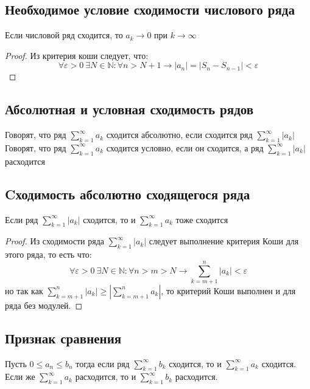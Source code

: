 \documentclass[12pt]{article}
\theoremstyle{definition}
\begin{document}
\subsection{Необходимое условие сходимости числового ряда}
Если числовой ряд сходится, то $a_k \to 0$ при $k \to \infty $
\begin{proof}
Из критерия коши следует, что: $$\forall \varepsilon > 0 \ \exists N \in \mathbb{N}: \forall n >  N + 1 \to |a_n| = |S_n - S_{n-1}| < \varepsilon$$
\end{proof}

\subsection{Абсолютная и условная сходимость рядов}
Говорят, что ряд $\displaystyle\sum_{k = 1}^{\infty}a_k$ сходится абсолютно, если сходится ряд $\displaystyle\sum_{k = 1}^{\infty}|a_k|$ \\
Говорят, что ряд $\displaystyle\sum_{k = 1}^{\infty}a_k$ сходится условно, если он сходится, а ряд $\displaystyle\sum_{k = 1}^{\infty}|a_k|$ расходится 

\subsection{Cходимость абсолютно сходящегося ряда}
Если ряд $\displaystyle\sum_{k = 1}^{\infty}|a_k|$ сходится, то и $\displaystyle\sum_{k = 1}^{\infty}a_k$ тоже сходится
\begin{proof}
Из сходимости ряда $\displaystyle\sum_{k = 1}^{\infty}|a_k|$ следует выполнение критерия Коши для этого ряда, то есть что:
$$\forall \varepsilon > 0 \ \exists N \in \mathbb{N}: \forall n > m > N \to \displaystyle\sum_{k = m + 1}^{n}|a_k| < \varepsilon$$
но так как $\displaystyle\sum_{k = m + 1}^{n}|a_k| \geq \left|\displaystyle\sum_{k = m + 1}^{n}a_k\right|$, то критерий Коши выполнен и для ряда без модулей.
\end{proof}

\subsection{Признак сравнения}
Пусть $0 \leq a_n \leq b_n$ тогда если ряд $\displaystyle\sum_{k = 1}^{\infty}b_k$ сходится, то и $\displaystyle\sum_{k = 1}^{\infty}a_k$ сходится.\\
Если же $\displaystyle\sum_{k = 1}^{\infty}a_k$ расходится, то и $\displaystyle\sum_{k = 1}^{\infty}b_k$ расходится.
\end{document}
